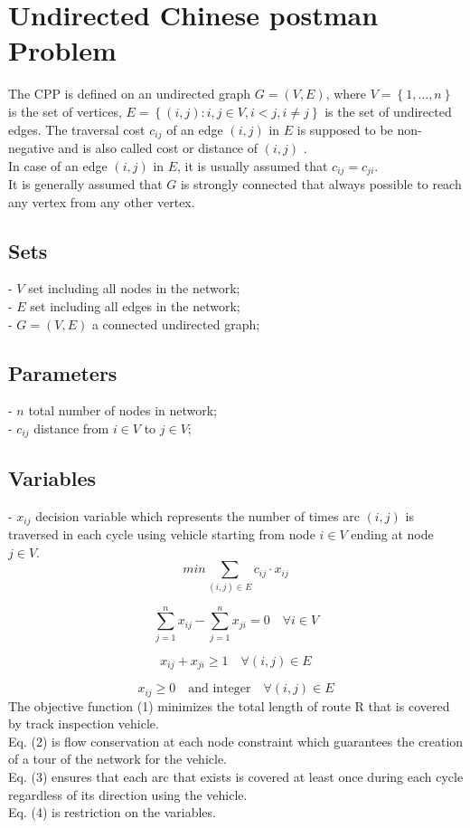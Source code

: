 \documentclass[a4paper,12pt,titlepage]{article}
\begin{document}
	\section*{Undirected Chinese postman Problem}

The CPP is defined on an undirected graph $G=(V,E)$, where $V=\left\lbrace 1,…, n\right\rbrace $ is the set of vertices, $E =\left\lbrace (i,j)
: i, j\in V, i<j, i\neq j\right\rbrace $ is the set of undirected edges. The traversal cost $c_{ij}$ of an edge $(i,j)$ in $E$ is supposed to be non-negative and is also called cost or distance of $(i,j)$ .\\ 
In case of an edge $(i,j)$ in $E$, it is usually assumed that $c_{ij} = c_ {ji}$. \\
It is generally assumed that $G$ is strongly connected that always possible to reach any vertex from any other vertex.
\subsection*{Sets}
- $V$ set including all nodes in the network;\\
- $E$ set including all edges in the network;\\
- $G=(V,E)$ a connected undirected graph;
\subsection*{Parameters}
- $n$ total number of nodes in network;\\
- $c_{ij}$ distance from $i \in V$ to $j \in V$;
\subsection*{Variables}
- $x_{ij}$ decision variable which represents the number of times arc $(i,j)$ is traversed in each cycle using vehicle starting from node $i\in V$ ending at node $j\in V$.
\begin{equation}
min \sum_{(i,j)\in E}c_{ij} \cdot x_{ij}
\end{equation}

\begin{equation}
\sum_{j=1}^{n} x_{ij} - \sum_{j=1}^{n} x_{ji} = 0 \quad \forall i\in V
\end{equation}

\begin{equation}
x_{ij} + x_{ji} \geq 1 \quad \forall (i,j)\in E
\end{equation}

\begin{equation}
x_{ij}\geq0 \quad \text{and integer} \quad \forall (i,j)\in E
\end{equation}
\newpage
The objective function (1) minimizes the total length of route R that is covered by track inspection vehicle. \\
Eq. (2) is flow conservation at each node constraint which guarantees the creation of a tour of the network for the vehicle. \\
Eq. (3) ensures that each arc that exists is covered at least once during each cycle regardless of its direction using the vehicle. \\
Eq. (4) is restriction on the variables.\\
\\
\end{document}
